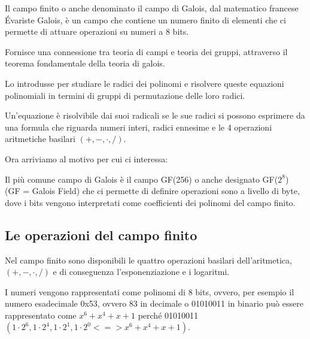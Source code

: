 \textsf{\small Il campo finito o anche denominato il campo di Galois, dal matematico francese Évariste Galois, è un campo che contiene un numero finito di elementi che ci permette di attuare operazioni su numeri a 8 bits.} %

\textsf{\small Fornisce una connessione tra teoria di campi e teoria dei gruppi, attraverso il teorema fondamentale della teoria di galois.} %

\textsf{\small Lo introdusse per studiare le radici dei polinomi e risolvere queste equazioni polinomiali in termini di gruppi di permutazione delle loro radici.}

\textsf{\small Un'equazione è risolvibile dai suoi radicali se le sue radici si possono esprimere da una formula che riguarda numeri interi, radici ennesime e le 4 operazioni aritmetiche basilari $(+, -, \cdot, /)$.}

\textsf{\small } %

\textsf{\small Ora arriviamo al motivo per cui ci interessa:} %

\textsf{\small Il più comune campo di Galois è il campo GF(256) o anche designato GF($2^8$) (GF = Galois Field) che ci permette di definire operazioni sono a livello di byte, dove i bits vengono interpretati come coefficienti dei polinomi del campo finito.}

\subsection{Le operazioni del campo finito} %

\textsf{\small Nel campo finito sono disponibili le quattro operazioni basilari dell'aritmetica, $(+, -, \cdot, /)$ e di conseguenza l'esponenziazione e i logaritmi.} %

\textsf{\small I numeri vengono rappresentati come polinomi di 8 bits, ovvero, per esempio il numero esadecimale 0x53, ovvero 83 in decimale o 01010011 in binario può essere rappresentato come $x^6 + x^4 + x + 1$ perché 01010011 $(1 \cdot 2^6, 1 \cdot 2^4, 1 \cdot 2^1, 1 \cdot 2^0 <=> x^6 + x^4 + x + 1)$. }

